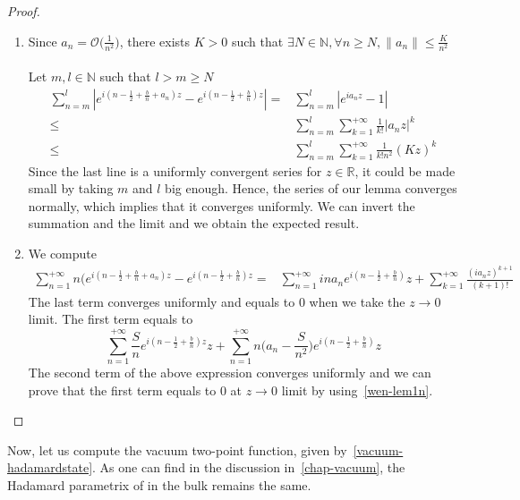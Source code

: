 \begin{proof}
\begin{enumerate}
\item Since $a_n =  \mathcal{O}\big(\frac{1}{n^2}\big)$, 
there exists $ K > 0$ such that $ \exists N \in\mathbb{N}, \forall n\geq N, \| a_n\| \leq \frac{K}{n^2}$ \\\\
Let $m,l\in\mathbb{N}$ such that $l > m \geq N$
\begin{equation*}
\begin{split}
\sum_{n=m}^{l}  | e^{i(n - \frac 1 2+\frac{b}{n}+a_n)z } - e^{i(n-\frac 1 2+\frac{b}{n})z } | = & 
\sum_{n=m}^{l} | e^{ia_n z} - 1 | \\
%
\leq & \sum_{n=m}^{l}\sum_{k=1}^{+\infty}\frac{1}{k!}| a_n z |^k \\
%
\leq & \sum_{n=m}^l \sum_{k=1}^{+\infty}\frac{1}{k!n^2}(Kz)^k
\end{split}
\end{equation*}
Since the last line is a uniformly convergent series for $z \in \mathbb{R}$, it could be made small by taking $m$ and $l$ big enough.
Hence, the series of our lemma converges normally, which implies that it converges uniformly.
We can invert the summation and the limit and we obtain the expected result.
%
\item We compute
\begin{equation*}
\begin{split}
\sum_{n=1}^{+\infty} n\big(e^{i(n-\frac 1 2 + \frac b n + a_n)z} - e^{i(n-\frac 1 2 + \frac b n)z} = &
\sum_{n=1}^{+\infty} i n a_n e^{i(n-\frac 1 2 + \frac b n)}z + \sum_{k=1}^{+\infty}\frac{(ia_nz)^{k+1}}{(k+1)!}
\end{split}
\end{equation*}
The last term converges uniformly and equals to 0 when we take the $z\rightarrow 0$ limit.
The first term equals to
\begin{equation*}
\sum_{n=1}^{+\infty} \frac{S}{n}e^{i(n-\frac 1 2 +\frac b n)z}z 
+ \sum_{n=1}^{+\infty}n\big(a_n - \frac{ S}{ n^2}\big) e^{i(n-\frac 1 2 +\frac b n)}z
\end{equation*}
The second term of the above expression converges uniformly and we can prove that the first term equals to 0 at $z\rightarrow 0$ limit by using~\cref{wen-lem1n}.
\end{enumerate}
\end{proof}
Now, let us compute the vacuum two-point function, given by~\cref{vacuum-hadamardstate}.
As one can find in the discussion in~\cref{chap-vacuum}, the Hadamard parametrix of in the bulk remains the same. 
